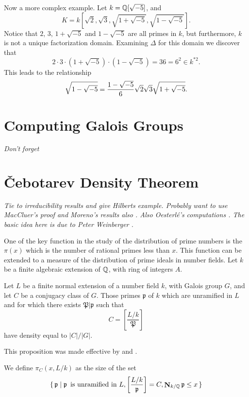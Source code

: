 \medskip
Now a more complex example.  Let $k = \mathbb{Q}[\sqrt{-5}]$, and 
\[
K = k[\sqrt{2}, \sqrt{3}, \sqrt{1+\sqrt{-5}}, \sqrt{1-\sqrt{-5}}].
\]
Notice that $2$, $3$, $1+\sqrt{-5}$ and $1-\sqrt{-5}$ are all primes in
$k$, but furthermore, $k$ is not a unique factorization domain.
Examining $\Delta$ for this domain we discover that
\[
2\cdot 3\cdot(1+\sqrt{-5})\cdot(1-\sqrt{-5})= 36 
  = 6^2 \in k^{\ast2}.
\]
This leads to the relationship
\[
\sqrt{1-\sqrt{-5}} 
  = {1 - \sqrt{-5} \over 6} \sqrt{2} \sqrt{3} \sqrt{1+\sqrt{-5}}.
\]

\section{Computing Galois Groups}

{\em Don't forget \cite{McKay1979-ud, Ford1989-vk}}

\section{\v{C}ebotarev Density Theorem}
\label{Cebotarev:Sec}

{\em Tie to irreducibility results and give Hilberts example.
Probably want to use MacCluer's proof \cite{MacCluer1968-we} and Moreno's
results also \cite{Moreno_undated-rv}.  Also Oesterl\'e's computations
\cite{Oesterle1979-wo}.  The basic idea here is due to Peter Weinberger
\cite{Weinberger1984-cx}.} 


One of the key function in the study of the distribution of prime
numbers is the $\pi(x)$ which is the number of rational primes less
than $x$.  This function can be extended to a measure of the
distribution of prime ideals in number fields.  Let $k$ be a finite
algebraic extension of $\mathbb{Q}$, with ring of integers $A$.

\begin{proposition}[\Chebotarev] 
\label{Cebotarev:Density:Prop}
Let $L$ be a finite normal extension of a number field $k$, with Galois
group $G$, and let $C$ be a conjugacy class of $G$.  Those primes $\mathfrak{p}$ of $k$ which are unramified in $L$ and for which there exists $\mathfrak{P} |\mathfrak{p}$ such that
\[
C = \left[\frac{L/k}{\mathfrak{P}}\right]
\]
have density equal to $|C|/|G|$.
\end{proposition}

This proposition was made effective by {\Lagarias} and {\Odlyzko}
\cite{Lagarias1977-be}.

We define $\pi_{C}(x, L/k)$ as the size of the set
\[
\{\, {\mathfrak p} \mid {\mathfrak p} \enspace\mbox{is unramified in $L$},
\left[\frac{L/k}{\mathfrak p}\right] = C, \mathop{\mathbf{N}}\nolimits_{k/\mathbb{Q}}{\mathfrak p} \le x\,\}
\]

